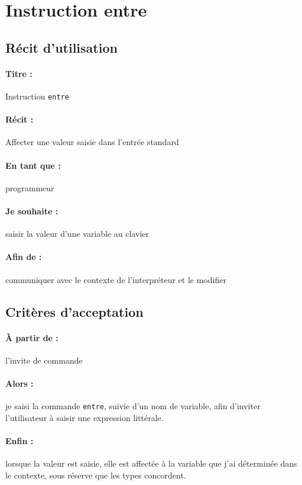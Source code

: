 \section{Instruction entre}

    \subsection*{Récit d'utilisation}

    \paragraph{Titre : } Instruction \verb|entre|
    \paragraph{Récit : } Affecter une valeur saisie dans l'entrée standard
    \paragraph{En tant que : } programmeur
    \paragraph{Je souhaite : } saisir la valeur d'une variable au clavier
    \paragraph{Afin de : } communiquer avec le contexte de l'interpréteur et le modifier

    \subsection*{Critères d'acceptation}

    \paragraph{À partir de : } l'invite de commande
    \paragraph{Alors : } je saisi la commande \verb|entre|, suivie d'un
        nom de variable, afin d'inviter l'utilisateur à saisir une expression littérale.
    \paragraph{Enfin : } lorsque la valeur est saisie, elle est affectée
        à la variable que j'ai déterminée dans le contexte, sous réserve
        que les types concordent.